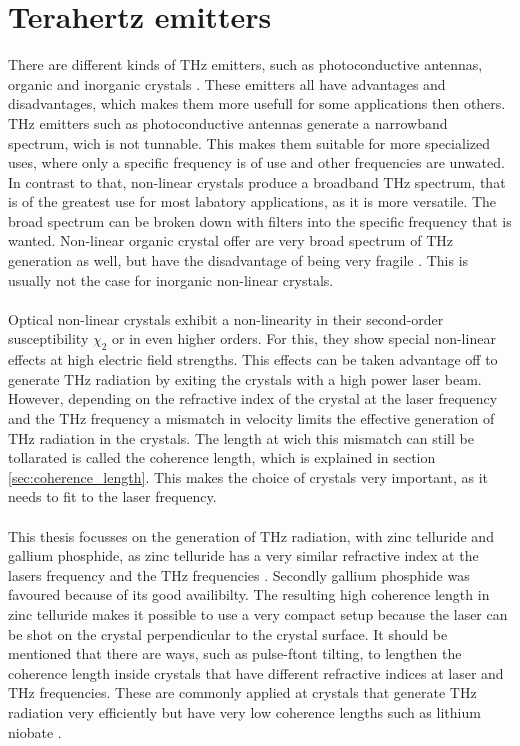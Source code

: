 \section{Terahertz emitters}
\label{sec:emitters}
There are different kinds of $\si{\tera\hertz}$ emitters, such as photoconductive antennas, organic and inorganic crystals \cite{Tutorial}.
These emitters all have advantages and disadvantages, which makes them more usefull for some applications then others.
$\si{\tera\hertz}$ emitters such as photoconductive antennas generate a narrowband spectrum, wich is not tunnable.
This makes them suitable for more specialized uses, where only a specific frequency is of use and other frequencies are unwated.
\\
In contrast to that, non-linear crystals produce a broadband $\si{\tera\hertz}$ spectrum, that is of the greatest use for most labatory applications, as it is more versatile.
The broad spectrum can be broken down with filters into the specific frequency that is wanted.
Non-linear organic crystal offer are very broad spectrum of $\si{\tera\hertz}$ generation as well, but have the disadvantage of being very fragile \cite{organic_crystals}.
This is usually not the case for inorganic non-linear crystals.
\\\\
Optical non-linear crystals exhibit a non-linearity in their second-order susceptibility $\chi_2$ or in even higher orders.
For this, they show special non-linear effects at high electric field strengths.
This effects can be taken advantage off to generate $\si{\tera\hertz}$ radiation by exiting the crystals with a high power laser beam.
\\
However, depending on the refractive index of the crystal at the laser frequency and the $\si{\tera\hertz}$ frequency a mismatch in velocity limits the effective generation of $\si{\tera\hertz}$ radiation in the crystals.
The length at wich this mismatch can still be tollarated is called the coherence length, which is explained in section \ref{sec:coherence_length}.
This makes the choice of crystals very important, as it needs to fit to the laser frequency.
\\\\
This thesis focusses on the generation of $\si{\tera\hertz}$ radiation, with zinc telluride and gallium phosphide, as zinc telluride has a very similar refractive index at the lasers frequency and the $\si{\tera\hertz}$ frequencies \cite{coherence_legnth}.
Secondly gallium phosphide was favoured because of its good availibilty.
The resulting high coherence length in zinc telluride makes it possible to use a very compact setup because the laser can be shot on the crystal perpendicular to the crystal surface.
It should be mentioned that there are ways, such as pulse-ftont tilting, to lengthen the coherence length inside crystals that have different refractive indices at laser and $\si{\tera\hertz}$ frequencies.
These are commonly applied at crystals that generate $\si{\tera\hertz}$ radiation very efficiently but have very low coherence lengths such as lithium niobate \cite{pulsefront_tilting}.
